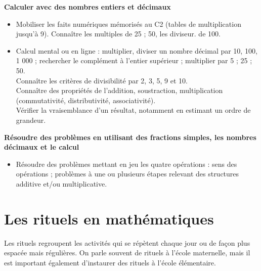 \begin{prerequis}
{\bf Calculer avec des nombres entiers et décimaux}
   \begin{itemize}
      \item Mobiliser les faits numériques mémorisés au C2 (tables de multiplication jusqu’à 9). Connaître les multiples de 25 ; 50, les diviseur. de 100.
      \item Calcul mental ou en ligne : multiplier, diviser un nombre décimal par 10, 100, 1 000 ; rechercher le complément à l’entier supérieur ; multiplier par 5 ; 25 ; 50. \\
      Connaître les critères de divisibilité par 2, 3, 5, 9 et 10. \\
      Connaître des propriétés de l’addition, soustraction, multiplication (commutativité, distributivité, associativité). \\
      Vérifier la vraisemblance d’un résultat, notamment en estimant un ordre de grandeur.
   \end{itemize}
{\bf Résoudre des problèmes en utilisant des fractions simples, les nombres décimaux et le calcul}
   \begin{itemize}
      \item Résoudre des problèmes mettant en jeu les quatre opérations : sens des opérations ; problèmes à une ou plusieurs étapes relevant des structures additive et/ou multiplicative.
   \end{itemize}
\end{prerequis}


\reperes


\section{Les rituels en mathématiques}

Les rituels regroupent les activités qui se répètent chaque jour ou de façon plus espacée mais régulières. On parle souvent de rituels à l'école maternelle, mais il est important également d'instaurer des rituels à l'école élémentaire.


